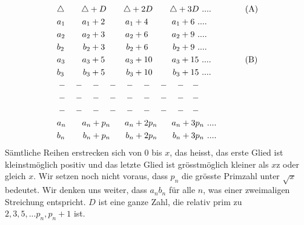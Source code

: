 \documentclass[UTF8,a4paper,zihao=-4]{article}
\begin{document}
\begin{align*}
&\triangle\hspace{2em}\triangle+D\hspace{2em}\triangle+2D\hspace{2em}\triangle+3D\ ....\hspace{4em}(\rm A)\\
&a_1\hspace{2em}a_1+2\hspace{2.4em}a_1+4\hspace{2.8em}a_1+6\ ....\\
&a_2\hspace{2em}a_2+3\hspace{2.4em}a_2+6\hspace{2.8em}a_2+9\ ....\\
&b_2\hspace{2.2em}b_2+3\hspace{2.5em}b_2+6\hspace{2.9em}b_2+9\ ....\\
&a_3\hspace{2em}a_3+5\hspace{2.4em}a_3+10\hspace{2.3em}a_3+15\ ....\hspace{4em}(\rm B)\\
&b_3\hspace{2.2em}b_3+5\hspace{2.5em}b_3+10\hspace{2.4em}b_3+15\ ....\\
&-\quad -\quad -\quad -\quad -\quad -\quad -\quad -\quad -\quad\\
&-\quad -\quad -\quad -\quad -\quad -\quad -\quad -\quad -\quad\\
&-\quad -\quad -\quad -\quad -\quad -\quad -\quad -\quad -\quad\\
&a_n\hspace{1.9em}a_n+p_n\hspace{1.7em}a_n+2p_n\hspace{1.7em}a_n+3p_n\ ....\\
&b_n\hspace{2.1em}b_n+p_n\hspace{1.8em}b_n+2p_n\hspace{1.8em}b_n+3p_n\ ....\\
\end{align*}
\indent Sämtliche Reihen erstrecken sich von $0$ bis $x$, das heisst, das erste Glied ist kleinstmöglich positiv und das letzte Glied ist grösstmöglich kleiner als $x$z oder gleich $x$. Wir setzen noch nicht voraus, dass $p_n$ die grösste Primzahl unter $\sqrt{x}$ bedeutet. Wir denken uns weiter, dass $a_n b_n$ für alle $n$, was einer zweimaligen Streichung entspricht. $D$ ist eine ganze Zahl, die relativ prim zu $2,3,5,...p_n,p_n+1$ ist.\\
\end{document}
